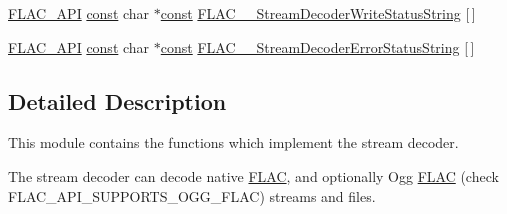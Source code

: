 \begin{DoxyCompactItemize}
\item 
\hyperlink{group__flac__export_ga56ca07df8a23310707732b1c0007d6f5}{F\+L\+A\+C\+\_\+\+A\+PI} \hyperlink{getopt1_8c_a2c212835823e3c54a8ab6d95c652660e}{const} char $\ast$\hyperlink{getopt1_8c_a2c212835823e3c54a8ab6d95c652660e}{const} \hyperlink{group__flac__stream__decoder_gae0c0c4f29a8524aedc58778504923297}{F\+L\+A\+C\+\_\+\+\_\+\+Stream\+Decoder\+Write\+Status\+String} \mbox{[}$\,$\mbox{]}
\item 
\hyperlink{group__flac__export_ga56ca07df8a23310707732b1c0007d6f5}{F\+L\+A\+C\+\_\+\+A\+PI} \hyperlink{getopt1_8c_a2c212835823e3c54a8ab6d95c652660e}{const} char $\ast$\hyperlink{getopt1_8c_a2c212835823e3c54a8ab6d95c652660e}{const} \hyperlink{group__flac__stream__decoder_gadc56befa033b67dd3befcd2f5f909ec1}{F\+L\+A\+C\+\_\+\+\_\+\+Stream\+Decoder\+Error\+Status\+String} \mbox{[}$\,$\mbox{]}
\end{DoxyCompactItemize}


\subsection{Detailed Description}
This module contains the functions which implement the stream decoder. 

The stream decoder can decode native \hyperlink{namespace_f_l_a_c}{F\+L\+AC}, and optionally Ogg \hyperlink{namespace_f_l_a_c}{F\+L\+AC} (check F\+L\+A\+C\+\_\+\+A\+P\+I\+\_\+\+S\+U\+P\+P\+O\+R\+T\+S\+\_\+\+O\+G\+G\+\_\+\+F\+L\+AC) streams and files.

